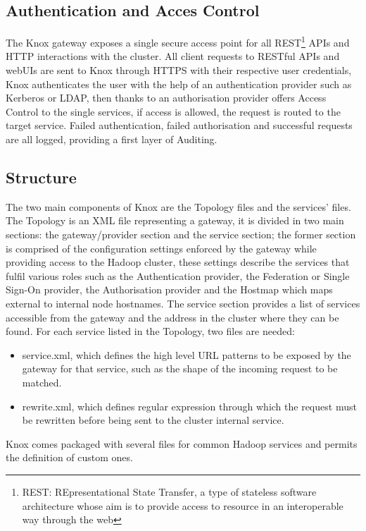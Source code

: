 \subsection{Authentication and Acces Control}
The Knox gateway exposes a single secure access point for all REST\footnote{REST: REpresentational State Transfer, a type of stateless software architecture whose aim is to provide access to resource in an interoperable way through the web} APIs and HTTP interactions with the cluster.\newline
All client requests to RESTful APIs and webUIs are sent to Knox through HTTPS with their respective user credentials, Knox authenticates the user with the help of an authentication provider such as Kerberos or LDAP, then thanks to an authorisation provider offers Access Control to the single services, if access is allowed, the request is routed to the target service.
Failed authentication, failed authorisation and successful requests are all logged, providing a first layer of Auditing.
\subsection{Structure}
The two main components of Knox are the Topology files and the services' files.
\newline
The Topology is an XML file representing a gateway, it is divided in two main sections: the gateway/provider section and the service section; the former section is comprised of the configuration settings enforced by the gateway while providing access to the Hadoop cluster, these settings describe the services that fulfil various roles such as the Authentication provider, the Federation or Single Sign-On provider, the Authorisation provider and the Hostmap which maps external to internal node hostnames.
The service section provides a list of services accessible from the gateway and the address in the cluster where they can be found.
\newline
For each service listed in the Topology, two files are needed: 
\begin{itemize}
	\item service.xml, which defines the high level URL patterns to be exposed by the gateway for that service, such as the shape of the incoming request to be matched.
	\item rewrite.xml, which defines regular expression through which the request must be rewritten before being sent to the cluster internal service.
\end{itemize}
Knox comes packaged with several files for common Hadoop services and permits the definition of custom ones. 

